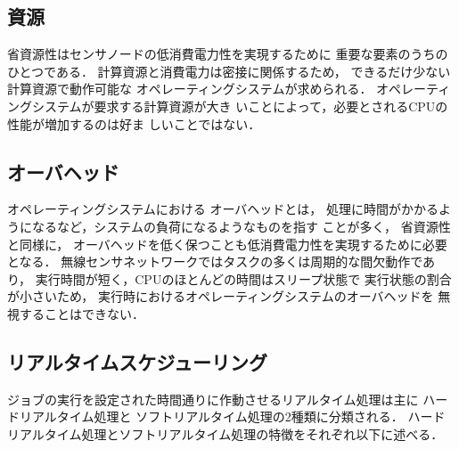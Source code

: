 \subsection{資源}
省資源性はセンサノードの低消費電力性を実現するために
重要な要素のうちのひとつである．
計算資源と消費電力は密接に関係するため，
できるだけ少ない計算資源で動作可能な
オペレーティングシステムが求められる．
オペレーティングシステムが要求する計算資源が大き
いことによって，必要とされるCPUの性能が増加するのは好ま
しいことではない．



\subsection{オーバヘッド}
オペレーティングシステムにおける
オーバヘッドとは，
処理に時間がかかるようになるなど，システムの負荷になるようなものを指す
ことが多く，
省資源性と同様に，
オーバヘッドを低く保つことも低消費電力性を実現するために必要となる．
無線センサネットワークではタスクの多くは周期的な間欠動作であり，
実行時間が短く，CPUのほとんどの時間はスリープ状態で
実行状態の割合が小さいため，
実行時におけるオペレーティングシステムのオーバヘッドを
無視することはできない．





\subsection{リアルタイムスケジューリング}
ジョブの実行を設定された時間通りに作動させるリアルタイム処理は主に
ハードリアルタイム処理と
ソフトリアルタイム処理の2種類に分類される．
ハードリアルタイム処理とソフトリアルタイム処理の特徴をそれぞれ以下に述べる．


